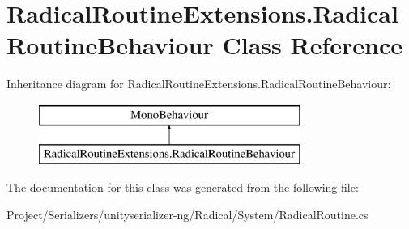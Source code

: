 \hypertarget{class_radical_routine_extensions_1_1_radical_routine_behaviour}{}\section{Radical\+Routine\+Extensions.\+Radical\+Routine\+Behaviour Class Reference}
\label{class_radical_routine_extensions_1_1_radical_routine_behaviour}
Inheritance diagram for Radical\+Routine\+Extensions.\+Radical\+Routine\+Behaviour\+:\begin{figure}[H]
\begin{center}
\leavevmode
\includegraphics[height=2.000000cm]{class_radical_routine_extensions_1_1_radical_routine_behaviour}
\end{center}
\end{figure}


The documentation for this class was generated from the following file\+:\begin{DoxyCompactItemize}
\item 
Project/\+Serializers/unityserializer-\/ng/\+Radical/\+System/Radical\+Routine.\+cs\end{DoxyCompactItemize}
